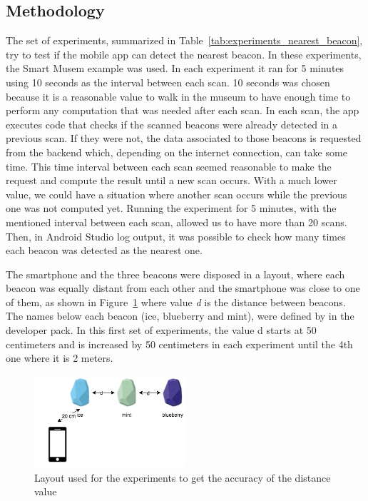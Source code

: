 \subsection{Methodology}
\label{sub:evaluation_nearest_beacon_methodology}
The set of experiments, summarized in Table~\ref{tab:experiments_nearest_beacon}, try to test if the mobile app can detect the nearest beacon.
In these experiments, the Smart Musem example was used.
In each experiment it ran for 5 minutes using 10 seconds as the interval between each scan.
10 seconds was chosen because it is a reasonable value to walk in the museum to have enough time to perform any computation that was needed after each scan.
In each scan, the app executes code that checks if the scanned beacons were already detected in a previous scan. If they were not, the data associated to those beacons is requested from the backend which, depending on the internet connection, can take some time.
This time interval between each scan seemed reasonable to make the request and compute the result until a new scan occurs.
With a much lower value, we could have a situation where another scan occurs while the previous one was not computed yet.
Running the experiment for 5 minutes, with the mentioned interval between each scan, allowed us to have more than 20 scans.
Then, in Android Studio log output, it was possible to check how many times each beacon was detected as the nearest one.

The smartphone and the three beacons were disposed in a layout, where each beacon was equally distant from each other and the smartphone was close to one of them, as shown in Figure~\ref{fig:layout_experiments_nearest_beacon} where value \emph{d} is the distance between beacons.
The names below each beacon (ice, blueberry and mint), were defined by  in
the developer pack.
In this first set of experiments, the value d starts at 50 centimeters and is increased by 50 centimeters in each experiment until the 4th one where it is 2 meters.


\begin{figure}[!ht]
  \centering
    \includegraphics[width=0.5\textwidth, keepaspectratio]{images/nearest_beacon}
    \caption[Layout for experiments of nearest beacon]{Layout used for the experiments to get the accuracy of the distance value}
    \label{fig:layout_experiments_nearest_beacon}
\end{figure}

